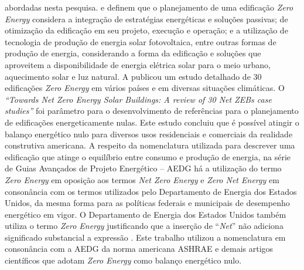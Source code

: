 abordadas nesta pesquisa.\vspace*{0.3cm} \newline
\textcite{Didone2014} e \textcite{Athienitis2015} definem que o planejamento de 
uma edificação \textit{Zero Energy} considera a integração de estratégias energéticas 
e soluções passivas; de otimização da edificação em seu projeto, execução e 
operação; e a utilização de tecnologia de produção de energia solar 
fotovoltaica, entre outras formas de produção de energia, considerando a 
forma da edificação e soluções que aproveitem a disponibilidade de energia 
elétrica solar para o meio urbano, aquecimento solar e luz natural.\vspace*{0.3cm} \newline
A \textcite{InternationalEnergyAgency-IEA2014} publicou um estudo detalhado de 
30 edificações \textit{Zero Energy} em vários países e em diversas situações climáticas. 
O \textit{“Towards Net Zero Energy Solar Buildings: A review of 30 Net ZEBs case studies”} 
foi parâmetro para o desenvolvimento de referências para o planejamento de edificações 
energeticamente nulas. Este estudo concluiu que é possível atingir o balanço energético 
nulo para diversos usos residenciais e comerciais da realidade construtiva americana.\vspace*{0.3cm} \newline
A respeito da nomenclatura utilizada para descrever uma edificação que atinge 
o equilíbrio entre consumo e produção de energia, na série de Guias Avançados de Projeto 
Energético – AEDG \cite{AmericanSocietyofHeatingRefrigeratingandAir-ConditioningEngineers-ASHRAE2019} 
há a utilização do termo \textit{Zero Energy} em oposição aos termos \textit{Net Zero Energy} 
e \textit{Zero Net Energy} em consonância com os termos utilizados pelo Departamento 
de Energia dos Estados Unidos, da mesma forma para as políticas federais e municipais 
de desempenho energético em vigor. O Departamento de Energia dos Estados Unidos também 
utiliza o termo \textit{Zero Energy} justificando que a inserção de “\textit{Net}” não 
adiciona significado substancial a expressão \cite{U.S.DepartmentofEnergy-USDOE2015a}. 
Este trabalho utilizou a nomenclatura em consonância com a AEDG da norma americana ASHRAE 
e demais artigos científicos que adotam \textit{Zero Energy} como balanço energético nulo.

